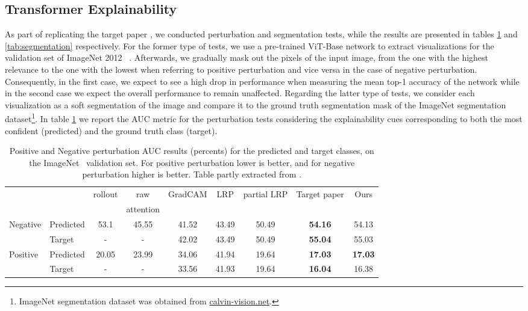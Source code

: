 \subsection{Transformer Explainability}
As part of replicating the target paper \cite{mainpaper}, we conducted perturbation and segmentation tests, while the results are presented in tables \ref{tab:perturbations} and \ref{tab:segmentation} respectively. For the former type of tests, we use a pre-trained ViT-Base network to extract visualizations for the validation set of ImageNet 2012 ~\cite{russakovsky2015ImageNet}. Afterwards, we gradually mask out the pixels of the input image, from the one with the highest relevance to the one with the lowest when referring to positive perturbation and vice versa in the case of negative perturbation. Consequently, in the first case, we expect to see a high drop in performance when measuring the mean top-1 accuracy of the network while in the second case we expect the overall performance to remain unaffected. Regarding the latter type of tests, we consider each visualization as a soft segmentation of the image and compare it to the ground truth segmentation mask of the ImageNet segmentation dataset\footnote{ImageNet segmentation dataset was obtained from \href{http://calvin-vision.net/bigstuff/proj-imagenet/data/gtsegs_ijcv.mat}{calvin-vision.net}.}.  In 
table \ref{tab:perturbations} we report the AUC metric for the perturbation tests considering the explainability cues corresponding to both the most confident (predicted) and the ground truth class (target).

\begin{table}[!h]
\centering \begin{adjustbox}{width=0.9\textwidth} \small
     \begin{tabular*}{\linewidth}{@{\extracolsep{\fill}}llccccccc}
        &&rollout & raw  & GradCAM & LRP & partial LRP & Target paper & Ours\\
        & &~\cite{samira2005} & attention &~\cite{selvaraju2017grad} &~\cite{binder2016layer} &~\cite{voita2019analyzing} &~\cite{mainpaper} & \\
       {Negative} &Predicted & 53.1 & 45.55 & 41.52 & 43.49 & 50.49 & \textbf{54.16} & 54.13\\
        &Target & - & - & 42.02 & 43.49 & 50.49 & \textbf{55.04} & 55.03 \\
        {Positive} &Predicted & 20.05 & 23.99 & 34.06 & 41.94 & 19.64 & \textbf{17.03} & \textbf{17.03}\\
        &Target & - & - & 33.56 & 41.93 & 19.64 & \textbf{16.04} & 16.38\\
    \end{tabular*}
    \end{adjustbox}
    \caption{Positive and Negative perturbation AUC results (percents) for the predicted and target classes, on the ImageNet~\cite{russakovsky2015ImageNet} validation set. For positive perturbation lower is better, and for negative perturbation higher is better. Table partly extracted from \cite{mainpaper}.}
    \label{tab:perturbations}
\end{table}

